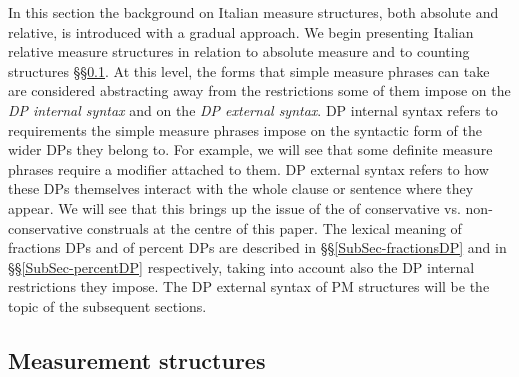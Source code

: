 \documentclass[charis, linguex]{glossa}
\begin{document}
In this section the background on Italian measure structures, both absolute and
relative, is introduced with a gradual approach. We begin presenting Italian
relative measure structures in relation to absolute measure and to counting
structures \S\S\ref{Sec-absvsrel}. At this level, the forms that simple measure
phrases can take are considered abstracting away from the restrictions some of
them impose on the \textit{DP internal syntax} and on the \textit{DP external
syntax}. DP internal syntax refers to requirements the simple measure phrases
impose on the syntactic form of the wider DPs they belong to. For example, we
will see that some definite measure phrases require a modifier attached to
them. DP external syntax refers to how these DPs themselves interact with the
whole clause or sentence where they appear. We will see that this brings up the
issue of the of conservative vs. non-conservative construals at the centre of
this paper. The lexical meaning of fractions DPs and of percent DPs are
described in \S\S\ref{SubSec-fractionsDP} and in \S\S\ref{SubSec-percentDP}
respectively, taking into account also the DP internal restrictions they
impose. The DP external syntax of PM structures will be the topic of the
subsequent sections.

\subsection{Measurement structures} \label{Sec-absvsrel}
\end{document}
